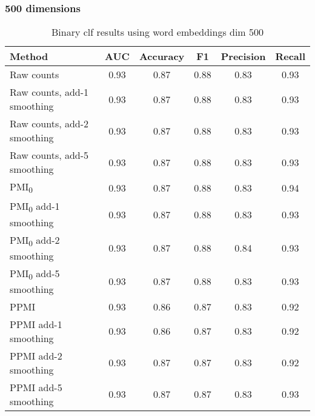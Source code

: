 \documentclass{article}
\begin{document}
\hypertarget{dimensions-1}{%
\subsubsection{500 dimensions}\label{dimensions-1}}

\begin{table}[htp]
 \caption{Binary clf results using word embeddings dim 500}
  \centering
  \begin{tabular}{|l|c|c|c|c|c|}
    \hline
    \rowcolor{lightgray} \textbf{Method} & \textbf{AUC} & \textbf{Accuracy} & \textbf{F1} & \textbf{Precision} & \textbf{Recall} \\
    \hline
    Raw counts & \cellcolor{green} 0.93 & \cellcolor{green} 0.87 & \cellcolor{green} 0.88 & 0.83 & 0.93 \\
    \hline
    Raw counts, add-1 smoothing & \cellcolor{green} 0.93 & \cellcolor{green} 0.87 & \cellcolor{green} 0.88 & 0.83 & 0.93 \\
    \hline
    Raw counts, add-2 smoothing & \cellcolor{green} 0.93 & \cellcolor{green} 0.87 & \cellcolor{green} 0.88 & 0.83 & 0.93 \\
    \hline
    Raw counts, add-5 smoothing & \cellcolor{green} 0.93 & \cellcolor{green} 0.87 & \cellcolor{green} 0.88 & 0.83 & 0.93 \\
    \hline
    \cellcolor{green} PMI\textsubscript{0} & \cellcolor{green} 0.93 & \cellcolor{green} 0.87 & \cellcolor{green} 0.88 & 0.83 & \cellcolor{green} 0.94 \\
    \hline
    PMI\textsubscript{0} add-1 smoothing & \cellcolor{green} 0.93 & \cellcolor{green} 0.87 & \cellcolor{green} 0.88 & 0.83 & 0.93 \\
    \hline
    \cellcolor{green} PMI\textsubscript{0} add-2 smoothing & \cellcolor{green} 0.93 & \cellcolor{green} 0.87 & \cellcolor{green} 0.88 & \cellcolor{green} 0.84 & 0.93 \\
    \hline
    PMI\textsubscript{0} add-5 smoothing & \cellcolor{green} 0.93 & \cellcolor{green} 0.87 & \cellcolor{green} 0.88 & 0.83 & 0.93 \\
    \hline
    PPMI & \cellcolor{green} 0.93 & 0.86 & 0.87 & 0.83 & 0.92 \\
    \hline
    PPMI add-1 smoothing & \cellcolor{green} 0.93 & 0.86 & 0.87 & 0.83 & 0.92 \\
    \hline
    PPMI add-2 smoothing & \cellcolor{green} 0.93 & \cellcolor{green} 0.87 & 0.87 & 0.83 & 0.92 \\
    \hline
    PPMI add-5 smoothing & \cellcolor{green} 0.93 & \cellcolor{green} 0.87 & 0.87 & 0.83 & 0.93 \\

\end{tabular}
\end{table}
\end{document}

